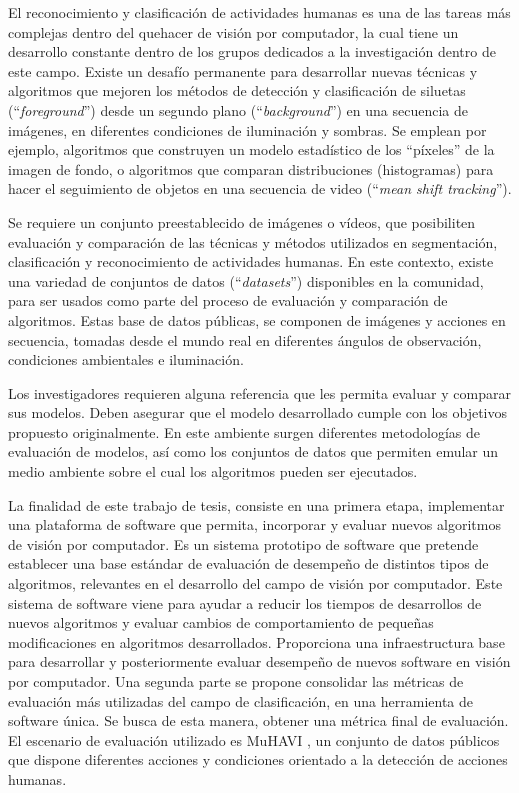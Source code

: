 \indent El reconocimiento y clasificación de actividades humanas es una de las tareas más complejas dentro del quehacer de visión por computador, la cual tiene un desarrollo constante dentro de los grupos dedicados a la investigación dentro de este campo. Existe un desafío permanente para desarrollar nuevas técnicas y algoritmos que mejoren los métodos de detección y clasificación de siluetas (``\textit{foreground}'') desde un segundo plano (``\textit{background}'') en una secuencia de imágenes, en diferentes condiciones de iluminación y sombras. Se emplean por ejemplo, algoritmos que construyen un modelo estadístico de los ``píxeles'' de la imagen de fondo, o algoritmos que comparan distribuciones (histogramas) para hacer el seguimiento de objetos en una secuencia de video (``\textit{mean shift tracking}''). 

\indent Se requiere un conjunto preestablecido de imágenes o vídeos, que posibiliten evaluación y comparación de las técnicas y métodos utilizados en segmentación, clasificación y reconocimiento de actividades humanas. En este contexto, existe una variedad de conjuntos de datos (``\textit{datasets}'') disponibles en la comunidad, para ser usados como parte del proceso de evaluación y comparación de algoritmos. Estas base de datos públicas, se componen de imágenes y acciones en secuencia, tomadas desde el mundo real en diferentes ángulos de observación, condiciones ambientales e iluminación.

\indent Los investigadores requieren alguna referencia que les permita evaluar y comparar sus modelos. Deben asegurar que el modelo desarrollado cumple con los objetivos propuesto originalmente. En este ambiente surgen diferentes metodologías de evaluación de modelos, así como los conjuntos de datos que permiten emular un medio ambiente sobre el cual los algoritmos pueden ser ejecutados. 



\indent La finalidad de este trabajo de tesis, consiste en una primera etapa, implementar una plataforma de software que permita, incorporar y evaluar nuevos algoritmos de visión por computador. Es un sistema prototipo de software que pretende establecer una base estándar de evaluación de desempeño de distintos tipos de algoritmos, relevantes en el desarrollo del campo de visión por computador. Este sistema de software viene para ayudar a reducir los tiempos de desarrollos de nuevos algoritmos y evaluar cambios de comportamiento de pequeñas modificaciones en algoritmos desarrollados. Proporciona una infraestructura base para desarrollar y posteriormente evaluar desempeño de nuevos software en visión por computador. Una segunda parte se propone consolidar las métricas de evaluación más utilizadas del campo de clasificación, en una herramienta de software única. Se busca de esta manera, obtener una métrica final de evaluación. El escenario de evaluación utilizado es MuHAVI \cite{singh_muhavi_2010}, un conjunto de datos públicos que dispone diferentes acciones y condiciones orientado a la detección de acciones humanas.


